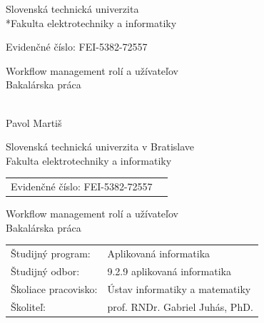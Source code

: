 \documentclass[12pt, oneside]{book}
\def\mfrok{2016}
\def\mfnazov{Workflow management rolí a užívateľov}
\def\mftyp{Bakalárska práca}
\def\mfautor{Pavol Martiš}
\def\mfskolitel{prof. RNDr. Gabriel Juhás, PhD.}
\def\mfevidenceneCislo{FEI-5382-72557}
\def\mfkonzultant{tit. Meno Priezvisko, tit. }
\def\mfodbor{ 9.2.9 aplikovaná informatika }
\def\program{ Aplikovaná informatika }
\def\mfpracovisko{ Ústav informatiky a matematiky }
\begin{document}
     

\thispagestyle{empty}

\begin{center}
\sc\large
Slovenská technická univerzita
\\*Fakulta elektrotechniky a informatiky\\
\end{center}


{	
	Evidenčné číslo: \mfevidenceneCislo
	\noindent 
}

\vfill
\begin{center}
{\LARGE\mfnazov}\\
\Large\mftyp
\end{center}

\vfill

{\sc\large 
\noindent \mfrok\\
\mfautor
}

\eject %


\thispagestyle{empty}
\noindent

\begin{center}
\sc  
\large
Slovenská technická univerzita v Bratislave\\
Fakulta elektrotechniky a informatiky\\
\end{center}
\begin{tabular}{ll}
Evidenčné číslo: \mfevidenceneCislo
\end{tabular}

\vfill

\begin{center}
{\LARGE\mfnazov}\\
\Large \mftyp
\end{center}

\vfill

\noindent
\begin{tabular}{ll}
Študijný program: & \program \\
Študijný odbor: & \mfodbor \\
Školiace pracovisko: & \mfpracovisko \\
Školiteľ: & \mfskolitel \\
\end{tabular}

\vfill
\end{document}
